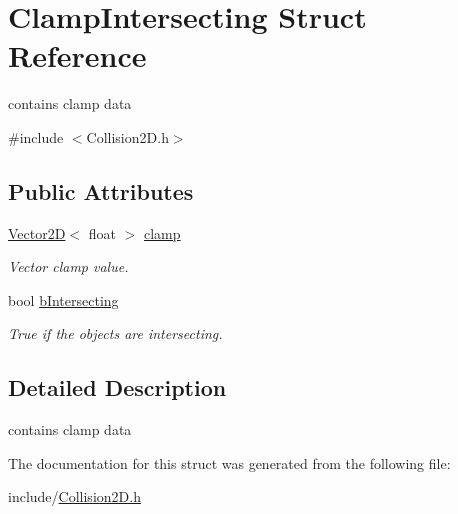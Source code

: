 \hypertarget{struct_clamp_intersecting}{\section{Clamp\+Intersecting Struct Reference}
\label{struct_clamp_intersecting}
}


contains clamp data  




{\ttfamily \#include $<$Collision2\+D.\+h$>$}

\subsection*{Public Attributes}
\begin{DoxyCompactItemize}
\item 
\hypertarget{struct_clamp_intersecting_a0ebcd8cbac2c6237228b0db439b514d4}{\hyperlink{class_vector2_d}{Vector2\+D}$<$ float $>$ \hyperlink{struct_clamp_intersecting_a0ebcd8cbac2c6237228b0db439b514d4}{clamp}}\label{struct_clamp_intersecting_a0ebcd8cbac2c6237228b0db439b514d4}

\begin{DoxyCompactList}\small\item\em Vector clamp value. \end{DoxyCompactList}\item 
\hypertarget{struct_clamp_intersecting_a7233e4f7677df0b463bb2b38d6cfeb64}{bool \hyperlink{struct_clamp_intersecting_a7233e4f7677df0b463bb2b38d6cfeb64}{b\+Intersecting}}\label{struct_clamp_intersecting_a7233e4f7677df0b463bb2b38d6cfeb64}

\begin{DoxyCompactList}\small\item\em True if the objects are intersecting. \end{DoxyCompactList}\end{DoxyCompactItemize}


\subsection{Detailed Description}
contains clamp data 

The documentation for this struct was generated from the following file\+:\begin{DoxyCompactItemize}
\item 
include/\hyperlink{_collision2_d_8h}{Collision2\+D.\+h}\end{DoxyCompactItemize}
